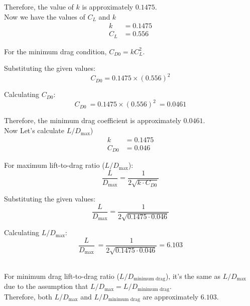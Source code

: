 \documentclass[12 pt]{article}
\begin{document}
Therefore, the value of \( k \) is approximately \(0.1475\).\\

Now we have the values of $C_L$ and $k$
\begin{align*}
    k & = 0.1475 \\
    C_L & = 0.556
\end{align*}

For the minimum drag condition, \( C_{D0} = kC_L^2 \).

Substituting the given values:
\[
C_{D0} = 0.1475 \times (0.556)^2
\]

Calculating \( C_{D0} \):
\[
C_{D0} \ = 0.1475 \times (0.556)^2 \ = 0.0461
\]

Therefore, the minimum drag coefficient is approximately \(0.0461\).\\
Now Let's calculate \( L/D_{\text{max}} \))
\begin{align*}
    k & = 0.1475 \\
    C_{D0} & = 0.046
\end{align*}

For maximum lift-to-drag ratio (\( L/D_{\text{max}} \)):
\[
\frac{L}{D_{\text{max}}} = \frac{1}{2\sqrt{k \cdot C_{D0}}}
\]

Substituting the given values:
\[
\frac{L}{D_{\text{max}}} = \frac{1}{2\sqrt{0.1475 \cdot 0.046}}
\]

Calculating \( L/D_{\text{max}} \):
\[
\frac{L}{D_{\text{max}}} \ =  \frac{1}{2\sqrt{0.1475 \cdot 0.046}} = 6.103
\]

\\For minimum drag lift-to-drag ratio (\( L/D_{\text{minimum drag}} \)), it's the same as \( L/D_{\text{max}} \) due to the assumption that \( L/D_{\text{max}} = L/D_{\text{minimum drag}} \).\\ 

Therefore, both \( L/D_{\text{max}} \) and \( L/D_{\text{minimum drag}} \) are approximately \(6.103\).
\end{document}

